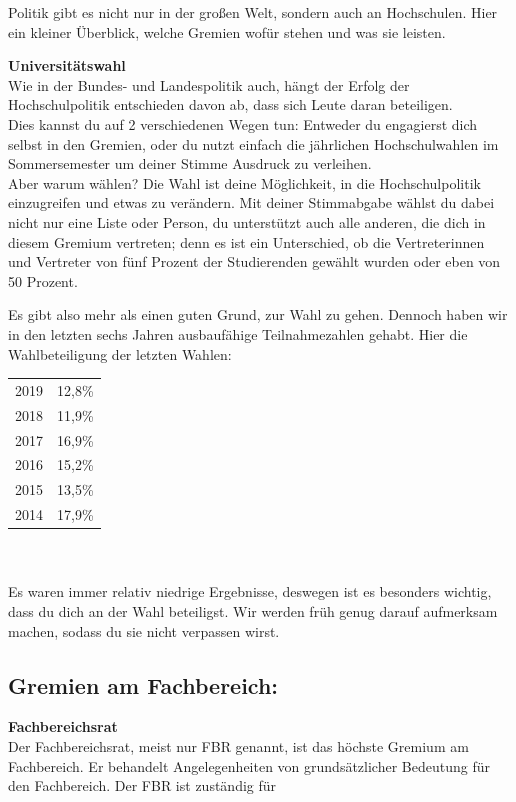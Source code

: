 {Politik gibt es nicht nur in der großen Welt, sondern auch an Hochschulen. Hier ein kleiner Überblick, welche Gremien wofür stehen und was sie leisten.
}{
\noindent\textbf{Universitätswahl}\\
Wie in der Bundes- und Landespolitik auch, hängt der Erfolg der Hochschulpolitik entschieden davon ab, dass sich Leute daran beteiligen.\\
Dies kannst du auf 2 verschiedenen Wegen tun: Entweder du engagierst dich selbst in den Gremien, oder du nutzt einfach die jährlichen Hochschulwahlen im Sommersemester um deiner Stimme Ausdruck zu verleihen.\\
Aber warum wählen? Die Wahl ist deine Möglichkeit, in die Hochschulpolitik einzugreifen und etwas zu verändern. Mit deiner Stimmabgabe wählst du dabei nicht nur eine Liste oder Person, du unterstützt auch alle anderen, die dich in diesem Gremium vertreten; denn es ist ein Unterschied, ob die Vertreterinnen und Vertreter von fünf Prozent der Studierenden gewählt wurden oder eben von 50 Prozent.

Es gibt also mehr als einen guten Grund, zur Wahl zu gehen. Dennoch haben wir in den letzten sechs Jahren ausbaufähige Teilnahmezahlen gehabt. Hier die Wahlbeteiligung der letzten Wahlen:\\

\begin{tabular}{ll}
2019 &  12,8\%\\
2018 &  11,9\%\\
2017 &  16,9\%\\
2016 &  15,2\%\\
2015 &  13,5\%\\
2014 &  17,9\%\\
\end{tabular}
\\\\
Es waren immer relativ niedrige Ergebnisse, deswegen ist es besonders wichtig, dass du dich an der Wahl beteiligst. Wir werden früh genug darauf aufmerksam machen, sodass du sie nicht verpassen wirst.

\noindent
\subsection*{Gremien am Fachbereich:}
\textbf{Fachbereichsrat}\\
Der Fachbereichsrat, meist nur FBR genannt, ist das höchste Gremium am Fachbereich. Er behandelt Angelegenheiten von grundsätzlicher Bedeutung für den Fachbereich. Der FBR ist zuständig für

}
